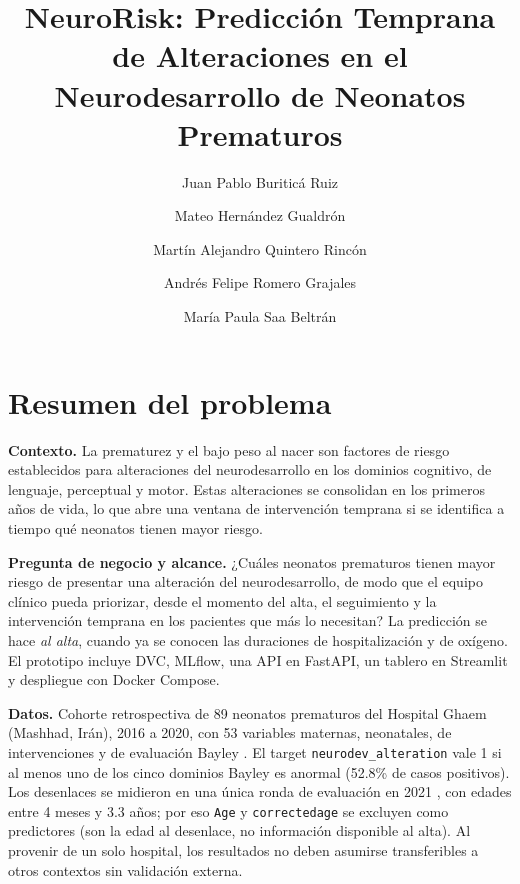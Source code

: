 \documentclass{llncs}
\begin{document}
\title{NeuroRisk: Predicción Temprana de Alteraciones en el Neurodesarrollo de Neonatos Prematuros}

\author{Juan Pablo Buriticá Ruiz \and
Mateo Hernández Gualdrón \and
Martín Alejandro Quintero Rincón \and
Andrés Felipe Romero Grajales \and
María Paula Saa Beltrán}


\maketitle

\section{Resumen del problema}

\textbf{Contexto.} La prematurez y el bajo peso al nacer son factores de riesgo
establecidos para alteraciones del neurodesarrollo en los dominios cognitivo, de
lenguaje, perceptual y motor. Estas alteraciones se consolidan en los primeros
años de vida, lo que abre una ventana de intervención temprana si se identifica
a tiempo qué neonatos tienen mayor riesgo.

\textbf{Pregunta de negocio y alcance.} ¿Cuáles neonatos prematuros tienen mayor
riesgo de presentar una alteración del neurodesarrollo, de modo que el equipo
clínico pueda priorizar, desde el momento del alta, el seguimiento y la
intervención temprana en los pacientes que más lo necesitan? La predicción se hace
\emph{al alta}, cuando ya se conocen las duraciones de hospitalización y de
oxígeno. El prototipo incluye DVC, MLflow, una API en FastAPI, un tablero en
Streamlit y despliegue con Docker Compose.

\textbf{Datos.} Cohorte retrospectiva de 89 neonatos prematuros del Hospital
Ghaem (Mashhad, Irán), 2016 a 2020, con 53 variables maternas, neonatales, de
intervenciones y de evaluación Bayley \cite{darabi2024,bayley}. El target
\texttt{neurodev\_alteration} vale 1 si al menos uno de los cinco dominios
Bayley es anormal (52.8\% de casos positivos). Los desenlaces se midieron en una
única ronda de evaluación en 2021 \cite{faramarzi2023}, con edades entre 4 meses
y 3.3 años; por eso \texttt{Age} y \texttt{correctedage} se excluyen como
predictores (son la edad al desenlace, no información disponible al alta). Al
provenir de un solo hospital, los resultados no deben asumirse transferibles a
otros contextos sin validación externa.
\end{document}

